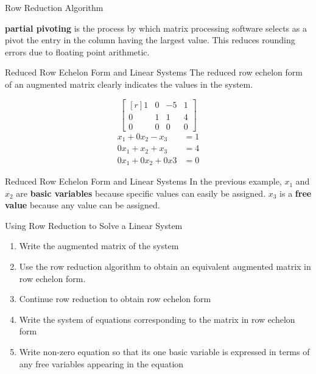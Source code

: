 \documentclass{beamer}
\begin{document}
\begin{frame}{Row Reduction Algorithm}
  \begin{definition}
    \textbf{partial pivoting} is the process by which matrix processing software selects as
    a pivot the entry in the column having the largest value. This reduces rounding errors
    due to floating point arithmetic.
  \end{definition}
\end{frame}

\begin{frame}{Reduced Row Echelon Form and Linear Systems}
  The reduced row echelon form of an augmented matrix clearly indicates the values in
  the system.
  \begin{example}
    \[
    \begin{bmatrix*}[r]
      1 & 0 & -5 & 1 \\
      0 & 1 & 1  & 4 \\
      0 & 0 & 0  & 0
    \end{bmatrix*}
    \]
    \begin{equation}
      \begin{split}
        x_{1}  + 0x_{2} - x_{3} &= 1 \\
        0x_{1} + x_{2}  + x_{3} &= 4 \\
        0x_{1} + 0x_{2} + 0x{3} &= 0 
      \end{split}
    \end{equation}
  \end{example}
\end{frame}

\begin{frame}{Reduced Row Echelon Form and Linear Systems}
  In the previous example, $x_{1}$ and $x_{2}$ are \textbf{basic variables} because specific
  values can easily be assigned. $x_{3}$ is a \textbf{free value} because any value can be assigned.
\end{frame}

\begin{frame}{Using Row Reduction to Solve a Linear System}
  \begin{enumerate}
    \item Write the augmented matrix of the system
    \item Use the row reduction algorithm to obtain an equivalent augmented matrix in row echelon form.
    \item Continue row reduction to obtain row echelon form
    \item Write the system of equations corresponding to the matrix in row echelon form 
    \item Write non-zero equation so that its one basic variable is expressed in terms of any free variables appearing in the equation
  \end{enumerate}
\end{frame}
\end{document}
